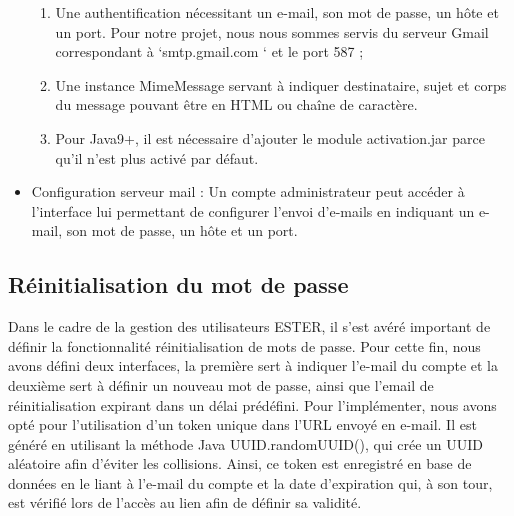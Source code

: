 \begin{itemize}
\begin{enumerate}
\item Une authentification nécessitant un e-mail, son mot de passe, un hôte et un port.  Pour notre projet, nous nous sommes servis du serveur Gmail correspondant à ‘smtp.gmail.com ‘ et le port 587 ;
\item Une instance MimeMessage servant à indiquer destinataire, sujet et corps du message pouvant être en HTML ou chaîne de caractère.
\item Pour Java9+, il est nécessaire d’ajouter le module activation.jar parce qu’il n’est plus activé par défaut. 
\end{enumerate}
\item Configuration serveur mail :
Un compte administrateur peut accéder à l’interface lui permettant de configurer l’envoi d’e-mails en indiquant un e-mail, son mot de passe, un hôte et un port. 

\end{itemize}
    

\subsection{Réinitialisation du mot de passe}
	Dans le cadre de la gestion des utilisateurs ESTER, il s’est avéré important de définir la fonctionnalité réinitialisation de mots de passe. Pour cette fin, nous avons défini deux interfaces, la première sert à indiquer l’e-mail du compte et la deuxième sert à définir un nouveau mot de passe, ainsi que l’email de réinitialisation expirant dans un délai prédéfini. Pour l’implémenter, nous avons opté pour l’utilisation d’un token unique dans l’URL envoyé en e-mail. Il est généré en utilisant la méthode Java UUID.randomUUID(), qui crée un UUID aléatoire afin d’éviter les collisions. Ainsi, ce token est enregistré en base de données en le liant à l’e-mail du compte et la date d’expiration qui, à son tour, est vérifié lors de l’accès au lien afin de définir sa validité.
